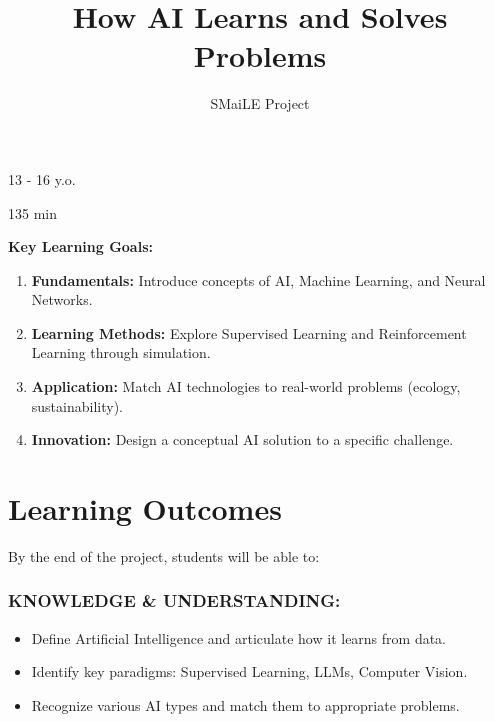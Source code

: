 \documentclass[11pt, a4paper]{article}
\begin{document}
\title{\textbf{\color{SmaileBlue}How AI Learns and Solves Problems}}
\author{SMaiLE Project}
\date{}
\maketitle
\thispagestyle{plain}

\begin{keyinfobox}
    \begin{description}[leftmargin=*, labelindent=0pt]
        \item[\bfseries\color{SmaileBlue} Target Group:] 13 - 16 y.o.
        \item[\bfseries\color{SmaileBlue} Duration:] 135 min
    \end{description}
    \textbf{Key Learning Goals:}
    \begin{enumerate}
        \item \textbf{Fundamentals:} Introduce concepts of AI, Machine Learning, and Neural Networks.
        \item \textbf{Learning Methods:} Explore Supervised Learning and Reinforcement Learning through simulation.
        \item \textbf{Application:} Match AI technologies to real-world problems (ecology, sustainability).
        \item \textbf{Innovation:} Design a conceptual AI solution to a specific challenge.
    \end{enumerate}
\end{keyinfobox}

\section*{Learning Outcomes}
By the end of the project, students will be able to:

\subsubsection*{KNOWLEDGE \& UNDERSTANDING:}
\begin{itemize}
    \item Define Artificial Intelligence and articulate how it learns from data.
    \item Identify key paradigms: Supervised Learning, LLMs, Computer Vision.
    \item Recognize various AI types and match them to appropriate problems.
\end{itemize}
\end{document}
